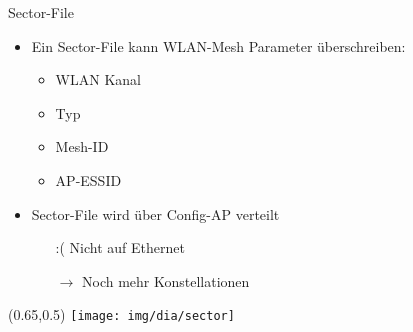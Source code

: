 \begin{frame}{Sector-File}
    \begin{itemize}
        \item Ein Sector-File kann WLAN-Mesh Parameter überschreiben:
        \begin{itemize}
            \item WLAN Kanal
            \item Typ
            \item Mesh-ID
            \item AP-ESSID
        \end{itemize}
        \item Sector-File wird über Config-AP verteilt
        \begin{itemize}
            \item[:(] Nicht auf Ethernet
            \item[$\rightarrow$] Noch mehr Konstellationen
        \end{itemize}
    \end{itemize}
    \begin{textblock*}{0.3\textwidth}(0.65\textwidth,0.5\textheight)
        \texttt{[image: img/dia/sector]}
    \end{textblock*}
\end{frame}

